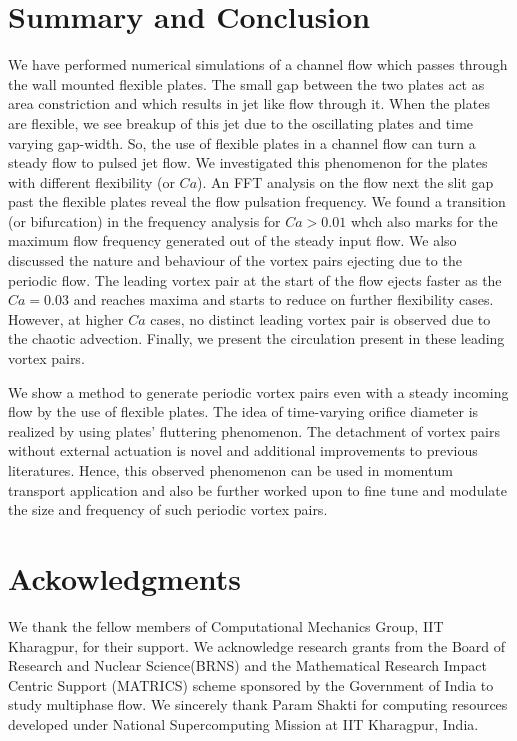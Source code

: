 \documentclass[final,3p,10pt,times,review,authoryear]{elsarticle}
\begin{document}
	\section{Summary and Conclusion}
	We have performed numerical simulations of a channel flow which passes through the wall mounted flexible plates. The small gap between the two plates act as area constriction and which results in jet like flow through it. When the plates are flexible, we see breakup of this jet due to the oscillating plates and time varying gap-width. So, the use of flexible plates in a channel flow can turn a steady flow to pulsed jet flow. We investigated this phenomenon for the plates with different flexibility (or $Ca$). An FFT analysis on the flow next the slit gap past the flexible plates reveal the flow pulsation frequency. We found a transition (or bifurcation) in the frequency analysis for $Ca>0.01$ whch also marks for the maximum flow frequency generated out of the steady input flow. We also discussed the nature and behaviour of the vortex pairs ejecting due to the periodic flow. The leading vortex pair at the start of the flow ejects faster as the $Ca=0.03$ and reaches maxima and starts to reduce on further flexibility cases. However, at higher $Ca$ cases, no distinct leading vortex pair is observed due to the chaotic advection. Finally, we present the circulation present in these leading vortex pairs.
	
	We show a method to generate periodic vortex pairs even with a steady incoming flow by the use of flexible plates. The idea of time-varying orifice diameter is realized by using plates' fluttering phenomenon. The detachment of vortex pairs without external actuation is novel and additional improvements to previous literatures. Hence, this observed phenomenon can be used in momentum transport application and also be further worked upon to fine tune and modulate the size and frequency of such periodic vortex pairs.
	
	\section*{Ackowledgments}
	We thank the fellow members of Computational Mechanics Group, IIT Kharagpur, for their support. We acknowledge research grants from the Board of Research and Nuclear Science(BRNS) and the Mathematical Research Impact Centric Support (MATRICS) scheme sponsored by the Government of India to study multiphase flow. We sincerely thank Param Shakti for computing resources developed under National Supercomputing Mission at IIT Kharagpur, India.

 






\end{document}
